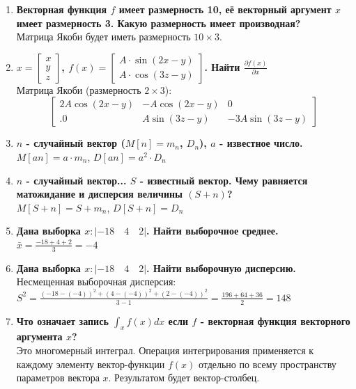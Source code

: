 \documentclass[12pt, a4paper]{article}
\begin{document}
\begin{enumerate}
    \item \textbf{Векторная функция $f$ имеет размерность 10, её векторный аргумент $x$ имеет размерность 3. Какую размерность имеет производная?} \\
    Матрица Якоби будет иметь размерность $10 \times 3$.

    \item \textbf{$x = \begin{bmatrix}x \\ y \\ z\end{bmatrix}$, $f(x) = \begin{bmatrix} A \cdot \sin(2x-y) \\ A \cdot \cos(3z-y) \end{bmatrix}$. Найти $\frac{\partial f(x)}{\partial x}$} \\
    Матрица Якоби (размерность $2 \times 3$):
    \[
    \begin{bmatrix} 
    2A\cos(2x-y) & -A\cos(2x-y) & 0 \\. 
    0 & A\sin(3z-y) & -3A\sin(3z-y) 
    \end{bmatrix}
    \]

    \item \textbf{$n$ - случайный вектор ($M[n]=m_n$, $D_n$), $a$ - известное число.} \\
    $M[an] = a \cdot m_n$, \quad $D[an] = a^2 \cdot D_n$

    \item \textbf{$n$ - случайный вектор... $S$ - известный вектор. Чему равняется матожидание и дисперсия величины $(S+n)$?} \\
    $M[S+n] = S + m_n$, \quad $D[S+n] = D_n$

    \item \textbf{Дана выборка $x:|-18 \quad 4 \quad 2|$. Найти выборочное среднее.} \\
    $\bar{x} = \frac{-18 + 4 + 2}{3} = -4$

    \item \textbf{Дана выборка $x:|-18 \quad 4 \quad 2|$. Найти выборочную дисперсию.} \\
    Несмещенная выборочная дисперсия:
    $S^2 = \frac{(-18 - (-4))^2 + (4 - (-4))^2 + (2 - (-4))^2}{3 - 1} = \frac{196 + 64 + 36}{2} = 148$

    \item \textbf{Что означает запись $\int_x f(x)dx$ если $f$ - векторная функция векторного аргумента $x$?} \\
    Это многомерный интеграл. Операция интегрирования применяется к каждому элементу вектор-функции $f(x)$ отдельно по всему пространству параметров вектора $x$. Результатом будет вектор-столбец.

\end{enumerate}
\end{document}
